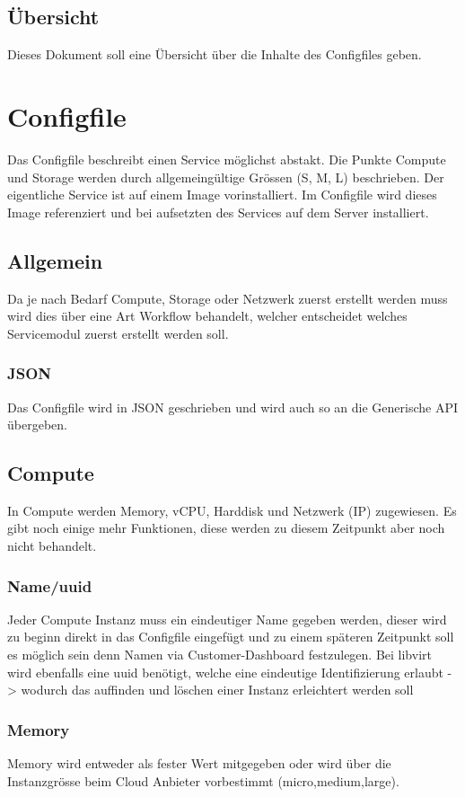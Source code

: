 \documentclass[11pt]{scrartcl}
\begin{document}
\subsection{Übersicht}
Dieses Dokument soll eine Übersicht über die Inhalte des Configfiles geben.

\section{Configfile}
Das Configfile beschreibt einen Service möglichst abstakt. Die Punkte Compute und Storage
werden durch allgemeingültige Grössen (S, M, L) beschrieben. Der eigentliche Service ist auf einem
Image vorinstalliert. Im Configfile wird dieses Image referenziert und bei aufsetzten des Services auf
dem Server installiert.

\subsection{Allgemein}
Da je nach Bedarf Compute, Storage oder Netzwerk zuerst erstellt werden muss 
wird dies über eine Art Workflow behandelt, welcher entscheidet welches
Servicemodul zuerst erstellt werden soll.

\subsubsection{JSON}
Das Configfile wird in JSON geschrieben und wird auch so an die Generische API 
übergeben.

\subsection{Compute}
In Compute werden Memory, vCPU, Harddisk und Netzwerk (IP) zugewiesen.
Es gibt noch einige mehr Funktionen, diese werden zu diesem Zeitpunkt aber noch 
nicht behandelt.

\subsubsection{Name/uuid}
Jeder Compute Instanz muss ein eindeutiger Name gegeben werden, dieser wird zu 
beginn direkt in das Configfile eingefügt und zu einem späteren Zeitpunkt soll 
es möglich sein denn Namen via Customer-Dashboard festzulegen.
Bei libvirt wird ebenfalls eine uuid benötigt, welche eine eindeutige 
Identifizierung erlaubt -> wodurch das auffinden und löschen einer Instanz 
erleichtert werden soll

\subsubsection{Memory}
Memory wird entweder als fester Wert mitgegeben oder wird über die Instanzgrösse 
beim Cloud Anbieter vorbestimmt (micro,medium,large).
\end{document}
